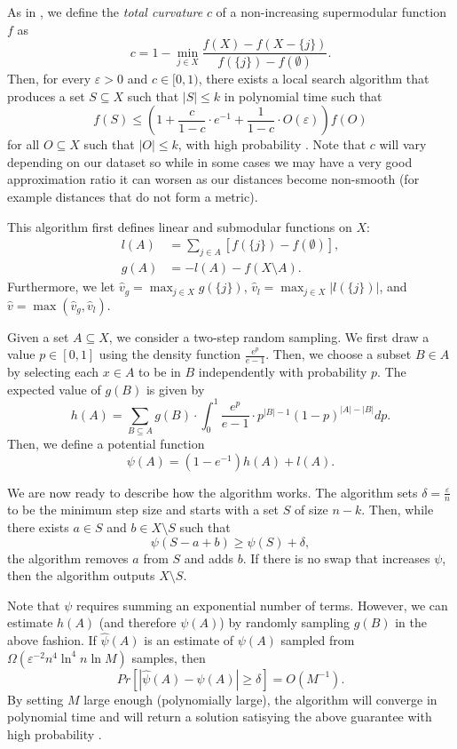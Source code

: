 \documentclass{article}
\begin{document}
As in \cite{Sviridenko}, we define the \emph{total curvature} $c$ of a non-increasing supermodular function $f$ as 
\[ c = 1 - \min_{j \in X}  \frac{ f(X) - f(X- \{j\})}{ f(\{j\}) - f(\emptyset)}.\]
Then, for every $\varepsilon >0$ and $c \in [0,1)$, there exists a local search algorithm that produces a set $S \subseteq X$ such that $|S| \leq k$ in polynomial time such that 
\[ f(S) \leq \left( 1 + \frac{c}{1-c} \cdot e^{-1} + \frac{1}{1-c} \cdot O(\varepsilon) \right) f(O) \]
for all $O \subseteq X$ such that $|O| \leq k$, with high probability \cite{Sviridenko}. Note that $c$ will vary depending on our dataset so while in some cases we may have a very good approximation ratio it can worsen as our distances become non-smooth (for example distances that do not form a metric). 

This algorithm first defines linear and submodular functions on $X$:
\begin{align*}
l(A) &= \sum_{j \in A} \left [ f(\{j\}) - f(\emptyset) \right], \\
g(A) & = - l(A) - f(X \setminus A).
\end{align*}
Furthermore, we let $\hat{v}_g = \max_{j \in X} g(\{j\})$, $\hat{v}_l = \max_{j \in X} |l(\{j\})|$, and $\hat{v} = \max(\hat{v}_g , \hat{v}_l)$. 

Given a set $A \subseteq X$, we consider a two-step random sampling. We first draw a value $p \in [0,1]$ using the density function $\frac{{e}^p}{e-1}$. Then, we choose a subset $B \in A$ by selecting each $x \in A$ to be in $B$ independently with probability $p$. The expected value of $g(B)$ is given by
\[  h(A) = \sum_{B \subseteq A} g(B) \cdot \int_{0}^1 \frac{e^p}{e-1} \cdot p^{|B|-1} (1-p)^{|A|-|B|} dp. \]
Then, we define a potential function
\[ \psi(A) = (1-e^{-1}) h(A) + l(A). \]

We are now ready to describe how the algorithm works. The algorithm sets $\delta = \frac{\varepsilon}{n}$ to be the minimum step size and starts with a set $S$ of size $n-k$. Then, while there exists $a \in S$ and $b \in X \setminus S$ such that 
\[ \psi(S -a +b) \geq \psi(S) + \delta, \]
the algorithm removes $a$ from $S$ and adds $b$. If there is no swap that increases $\psi$, then the algorithm outputs $X \setminus S$. 

Note that $\psi$ requires summing an exponential number of terms. However, we can estimate $h(A)$ (and therefore $\psi(A)$) by randomly sampling $g(B)$ in the above fashion. If $\hat{\psi}(A)$ is an estimate of $\psi(A)$ sampled from $\Omega (\varepsilon^{-2} n^4 \ln^4 n \ln M)$ samples, then 
\[ Pr[ | \hat{\psi}(A) - \psi(A) | \geq \delta ] = O(M^{-1}). \]
By setting $M$ large enough (polynomially large), the algorithm will converge in polynomial time and will return a solution satisying the above guarantee with high probability \cite{Sviridenko}. 
 
\end{document}
